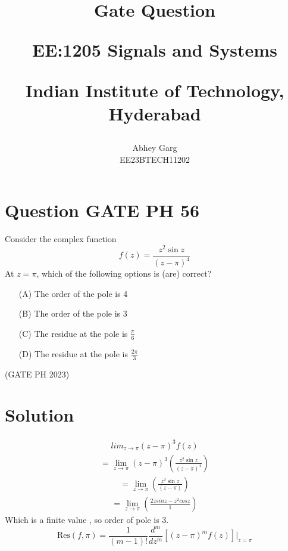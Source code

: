 \documentclass[journal,12pt,twocolumn]{IEEEtran}
\theoremstyle{remark}
\begin{document}
%




\vspace{3cm}

\title{
Gate Question

\large{EE:1205 Signals and Systems}

Indian Institute of Technology, Hyderabad
}
\author{Abhey Garg

EE23BTECH11202
}	


\maketitle

\newpage


\bigskip

\renewcommand{\thefigure}{\arabic{figure}}
\renewcommand{\thetable}{\arabic{table}}
\renewcommand{\theequation}{\arabic{equation}}

\section{Question GATE PH 56}
Consider the complex function
\[ f(z) = \frac{z^{2}\sin z}{(z-\pi)^4} \]
At \( z = \pi \), which of the following options is (are) correct?
\begin{enumerate}[label=\textbf{\arabic*.}, font=\bfseries, align=left]
    \item[(A)] The order of the pole is 4 
    \item[(B)] The order of the pole is 3 
    \item[(C)] The residue at the pole is \( \frac{\pi}{6} \)
    \item[(D)] The residue at the pole is \( \frac{2\pi}{3} \)
\end{enumerate}
\hfill (GATE PH 2023)
\section{Solution}


\begin{align}
lim_{{z \to \pi}} (z-\pi)^3 f(z) 
\end{align}
\begin{align}
= \lim_{{z \to \pi}} (z-\pi)^3 \left( \frac{{ z^2 \sin z}}{{(z-\pi)^4}} \right)
\end{align}
\begin{align}
= \lim_{{z \to \pi}}  \left( \frac{{ z^2 \sin z}}{{(z-\pi)}} \right)
\end{align}
\begin{align}
= \lim_{{z \to \pi}}  \left( \frac{2z sinz - z^2 cosz}{1} \right)
\end{align}
Which is a finite value , so order of pole is 3.
\begin{equation}
\text{Res}(f, \pi) = \frac{1}{(m-1)!} \frac{d^{m}}{dz^{m}} \left[ (z-\pi)^m f(z) \right] \Bigg|_{z=\pi}
\end{equation}
\end{document}
